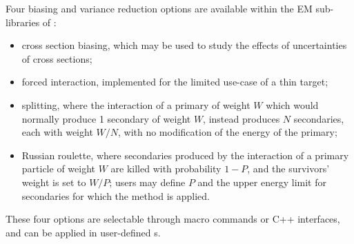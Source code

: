 Four biasing and variance reduction options are available within the EM
sub-libraries of \Gfour{} \cite{embib:uni2}: 
\begin{itemize}
\item cross section biasing, which may be used to study the effects of 
      uncertainties of cross sections;
\item forced interaction, implemented for the limited use-case of a thin target; 
\item splitting, where the interaction of a primary of weight $W$ which would 
      normally produce 1 secondary of weight $W$, instead produces $N$ secondaries,
      each with weight $W/N$, with no modification of the energy of the primary;
\item Russian roulette, where secondaries produced by the interaction of a
      primary particle of weight $W$ are killed with probability $1 - P$, and
      the survivors' weight is set to $W/P$; users may define $P$ and the upper 
      energy limit for secondaries for which the method is applied.
\end{itemize}

These four options are selectable through macro commands or C++ interfaces, 
and can be applied in user-defined s.
